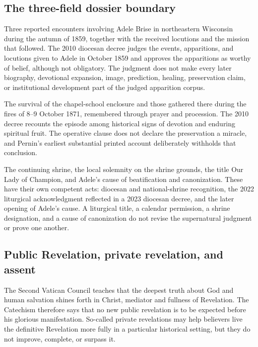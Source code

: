 {\subsection{The three-field dossier boundary}

\corpusboundary
  {Three reported encounters involving Adele Brise in northeastern Wisconsin during the autumn of 1859, together with the received locutions and the mission that followed.}
  {The 2010 diocesan decree judges the events, apparitions, and locutions given to Adele in October 1859 and approves the apparitions as worthy of belief, although not obligatory.}
  {The judgment does not make every later biography, devotional expansion, image, prediction, healing, preservation claim, or institutional development part of the judged apparition corpus.}

\corpusboundary
  {The survival of the chapel-school enclosure and those gathered there during the fires of 8--9 October 1871, remembered through prayer and procession.}
  {The 2010 decree recounts the episode among historical signs of devotion and enduring spiritual fruit.}
  {The operative clause does not declare the preservation a miracle, and Pernin's earliest substantial printed account deliberately withholds that conclusion.}

\corpusboundary
  {The continuing shrine, the local solemnity on the shrine grounds, the title Our Lady of Champion, and Adele's cause of beatification and canonization.}
  {These have their own competent acts: diocesan and national-shrine recognition, the 2022 liturgical acknowledgment reflected in a 2023 diocesan decree, and the later opening of Adele's cause.}
  {A liturgical title, a calendar permission, a shrine designation, and a cause of canonization do not revise the supernatural judgment or prove one another.}

\subsection{Public Revelation, private revelation, and assent}

The Second Vatican Council teaches that the deepest truth about God and human salvation shines forth in Christ, mediator and fullness of Revelation. The Catechism therefore says that no new public revelation is to be expected before his glorious manifestation. So-called private revelations may help believers live the definitive Revelation more fully in a particular historical setting, but they do not improve, complete, or surpass it.

}
